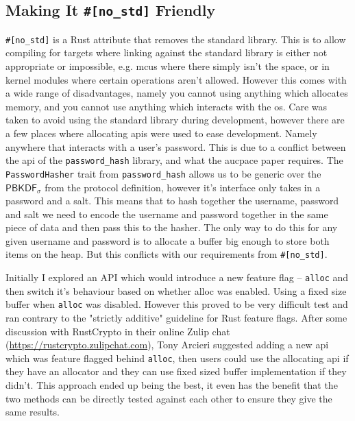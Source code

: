 \subsection{Making It \texttt{\#[no\_std]} Friendly}
\verb|#[no_std]| is a Rust attribute that removes the standard library.
This is to allow compiling for targets where linking against the standard library is either not appropriate or impossible, e.g. \glspl{mcu} where there simply isn't the space, or in kernel modules where certain operations aren't allowed.
However this comes with a wide range of disadvantages, namely you cannot using anything which allocates memory, and you cannot use anything which interacts with the \gls{os}.
Care was taken to avoid using the standard library during development, however there are a few places where allocating \glspl{api} were used to ease development.
Namely anywhere that interacts with a user's password.
This is due to a conflict between the \gls{api} of the \texttt{password\_hash} library, and what the \gls{aucpace} paper requires.
The \texttt{PasswordHasher} trait from \texttt{password\_hash} allows us to be generic over the $\textsf{PBKDF}_{\sigma}$ from the protocol definition, however it's interface only takes in a password and a salt.
This means that to hash together the username, password and salt we need to encode the username and password together in the same piece of data and then pass this to the hasher.
The only way to do this for any given username and password is to allocate a buffer big enough to store both items on the heap.
But this conflicts with our requirements from \verb|#[no_std]|.

Initially I explored an API which would introduce a new feature flag -- \texttt{alloc} and then switch it's behaviour based on whether alloc was enabled.
Using a fixed size buffer when \texttt{alloc} was disabled.
However this proved to be very difficult test and ran contrary to the "strictly additive" guideline for Rust feature flags.
After some discussion with RustCrypto in their online Zulip chat (\url{https://rustcrypto.zulipchat.com}), Tony Arcieri
suggested adding a new \gls{api} which was feature flagged behind \texttt{alloc}, then users could use the allocating \gls{api} if they have an allocator and they can use fixed sized buffer implementation if they didn't.
This approach ended up being the best, it even has the benefit that the two methods can be directly tested against each other to ensure they give the same results.

